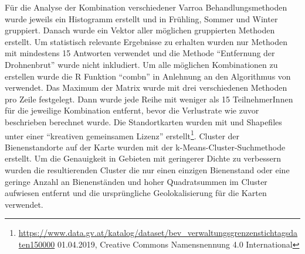 \newline
Für die Analyse der Kombination verschiedener Varroa Behandlungsmethoden wurde jeweils ein Histogramm erstellt und in Frühling, Sommer und Winter gruppiert. Danach wurde ein Vektor aller möglichen gruppierten Methoden erstellt. Um statistisch relevante Ergebnisse zu erhalten wurden nur Methoden mit mindestens 15 Antworten verwendet und die Methode \enquote{Entfernung der Drohnenbrut} wurde nicht inkludiert. Um alle möglichen Kombinationen zu erstellen wurde die R Funktion \enquote{combn} in Anlehnung an den Algorithmus von \cite{nijenhuis1978} verwendet. Das Maximum der Matrix wurde mit drei verschiedenen Methoden pro Zeile festgelegt. Dann wurde jede Reihe mit weniger als 15 TeilnehmerInnen für die jeweilige Kombination entfernt, bevor die Verlustrate wie zuvor beschrieben berechnet wurde.
\newline
Die Standortkarten wurden mit \cite{rcoreteam2020} und Shapefiles unter einer \enquote{kreativen gemeinsamen Lizenz} erstellt\footnote{\url{https://www.data.gv.at/katalog/dataset/bev_verwaltungsgrenzenstichtagsdaten150000} 01.04.2019, Creative Commons Namensnennung 4.0 International }. Cluster der Bienenstandorte auf der Karte wurden mit der k-Means-Cluster-Suchmethode erstellt. Um die Genauigkeit in Gebieten mit geringerer Dichte zu verbessern wurden die resultierenden Cluster die nur einen einzigen Bienenstand oder eine geringe Anzahl an Bienenständen und hoher Quadratsummen im Cluster aufwiesen entfernt und die ursprüngliche Geolokalisierung für die Karten verwendet.
